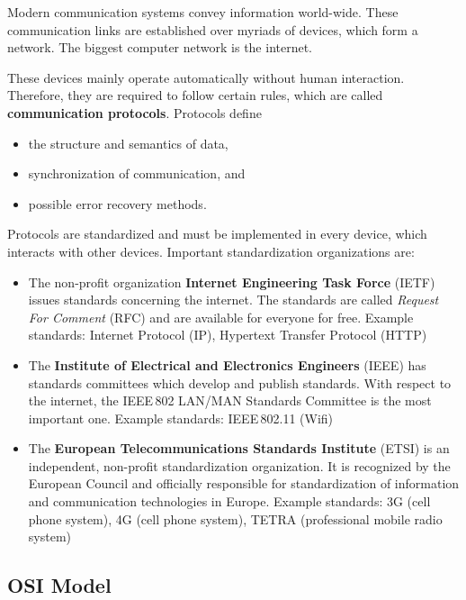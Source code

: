 Modern communication systems convey information world-wide. These communication links are established over myriads of devices, which form a network. The biggest computer network is the internet.

These devices mainly operate automatically without human interaction. Therefore, they are required to follow certain rules, which are called \textbf{communication protocols}. Protocols define
\begin{itemize}
	\item the structure and semantics of data,
	\item synchronization of communication, and
	\item possible error recovery methods.
\end{itemize}

Protocols are standardized and must be implemented in every device, which interacts with other devices. Important standardization organizations are:
\begin{itemize}
	\item The non-profit organization \textbf{Internet Engineering Task Force} (IETF) issues standards concerning the internet. The standards are called \emph{Request For Comment} (RFC) and are available for everyone for free. Example standards: Internet Protocol (IP), Hypertext Transfer Protocol (HTTP)
	\item The \textbf{Institute of Electrical and Electronics Engineers} (IEEE) has standards committees which develop and publish standards. With respect to the internet, the IEEE\,802 LAN/MAN Standards Committee is the most important one. Example standards: IEEE\,802.11 (Wifi)
	\item The \textbf{European Telecommunications Standards Institute} (ETSI) is an independent, non-profit standardization organization. It is recognized by the European Council and officially responsible for standardization of information and communication technologies in Europe. Example standards: 3G (cell phone system), 4G (cell phone system), TETRA (professional mobile radio system)
\end{itemize}


\subsection{OSI Model}

